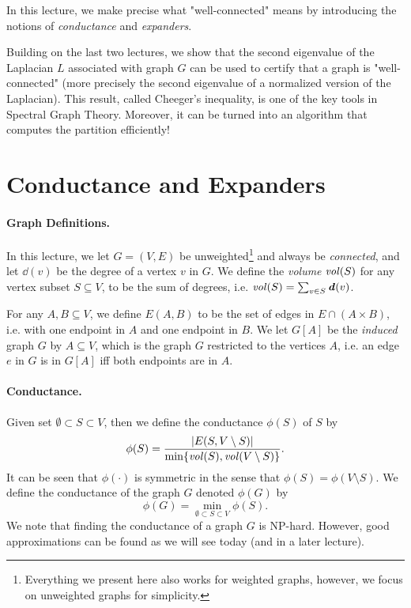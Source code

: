 In this lecture, we make precise what "well-connected" means by introducing the notions of \emph{conductance} and \emph{expanders}. 

Building on the last two lectures, we show that the second eigenvalue of the Laplacian $L$ associated with graph $G$ can be used to certify that a graph is "well-connected" (more precisely the second eigenvalue of a normalized version of the Laplacian). This result, called Cheeger's inequality, is one of the key tools in Spectral Graph Theory. Moreover, it can be turned into an algorithm that computes the partition efficiently!

\section{Conductance and Expanders}

\paragraph{Graph Definitions.} In this lecture, we let $G=(V,E)$ be unweighted\footnote{Everything we present here also works for weighted graphs, however, we focus on unweighted graphs for simplicity.} and always be \emph{connected}, and let $\dd(v)$ be the degree of a vertex $v$ in $G$. We define the \emph{volume} $\mathit{vol}(S)$ for any vertex subset $S \subseteq V$, to be the sum of degrees, i.e. $\mathit{vol}(S) = \sum_{v \in S} \boldsymbol{\mathit{d}}(v)$.

For any  $A, B \subseteq V$, we define $E(A, B)$ to be the set of edges in $E \cap (A \times B)$, i.e. with one endpoint in $A$ and one endpoint in $B$. We let $G[A]$ be the \emph{induced} graph $G$ by $A \subseteq V$, which is the graph $G$ restricted to the vertices $A$, i.e. an edge $e$ in $G$ is in $G[A]$ iff both endpoints are in $A$.

\paragraph{Conductance.} Given set $\emptyset \subset S \subset V$, then we define the conductance $\phi(S)$ of $S$ by
\[
\phi(S) = \frac{|E(S, V \setminus S)|}{ \min\{\mathit{vol}(S), \mathit{vol}(V \setminus S) \} }.
\]
It can be seen that $\phi(\cdot)$ is symmetric in the sense that $\phi(S) = \phi(V \setminus S)$. We define the conductance of the graph $G$ denoted $\phi(G)$ by
\[
    \phi(G) = \min_{\emptyset \subset S \subset V} \phi(S). 
\]
We note that finding the conductance of a graph $G$ is NP-hard. However, good approximations can be found as we will see today (and in a later lecture).


